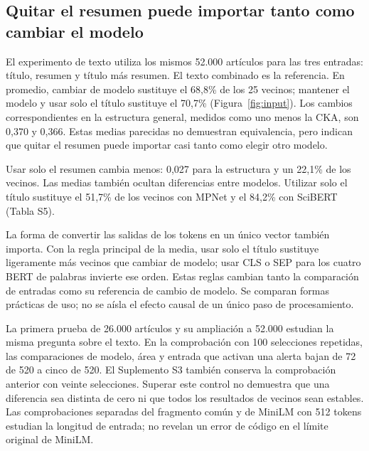 \subsection{Quitar el resumen puede importar tanto como cambiar el modelo}
El experimento de texto utiliza los mismos 52.000 artículos para las tres entradas: título, resumen y título más resumen. El texto combinado es la referencia. En promedio, cambiar de modelo sustituye el 68,8\% de los 25 vecinos; mantener el modelo y usar solo el título sustituye el 70,7\% (Figura~\ref{fig:input}). Los cambios correspondientes en la estructura general, medidos como uno menos la CKA, son 0,370 y 0,366. Estas medias parecidas no demuestran equivalencia, pero indican que quitar el resumen puede importar casi tanto como elegir otro modelo.

Usar solo el resumen cambia menos: 0,027 para la estructura y un 22,1\% de los vecinos. Las medias también ocultan diferencias entre modelos. Utilizar solo el título sustituye el 51,7\% de los vecinos con MPNet y el 84,2\% con SciBERT (Tabla S5).

La forma de convertir las salidas de los tokens en un único vector también importa. Con la regla principal de la media, usar solo el título sustituye ligeramente más vecinos que cambiar de modelo; usar CLS o SEP para los cuatro BERT de palabras invierte ese orden. Estas reglas cambian tanto la comparación de entradas como su referencia de cambio de modelo. Se comparan formas prácticas de uso; no se aísla el efecto causal de un único paso de procesamiento.

La primera prueba de 26.000 artículos y su ampliación a 52.000 estudian la misma pregunta sobre el texto. En la comprobación con 100 selecciones repetidas, las comparaciones de modelo, área y entrada que activan una alerta bajan de 72 de 520 a cinco de 520. El Suplemento S3 también conserva la comprobación anterior con veinte selecciones. Superar este control no demuestra que una diferencia sea distinta de cero ni que todos los resultados de vecinos sean estables. Las comprobaciones separadas del fragmento común y de MiniLM con 512 tokens estudian la longitud de entrada; no revelan un error de código en el límite original de MiniLM.

